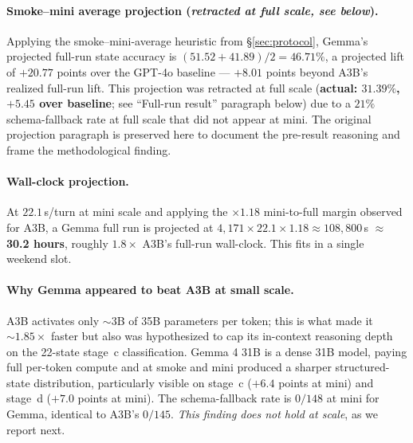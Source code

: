 \documentclass[11pt]{article}
\begin{document}
\paragraph{Smoke--mini average projection (\emph{retracted at full scale, see below}).} Applying the smoke--mini-average heuristic from \S\ref{sec:protocol}, Gemma's projected full-run state accuracy is $(51.52 + 41.89)/2 = 46.71\%$, a projected lift of $\boldsymbol{+20.77}$ points over the GPT-4o baseline --- $+8.01$ points beyond A3B's realized full-run lift. This projection was retracted at full scale (\textbf{actual: $31.39\%$, $+5.45$ over baseline}; see ``Full-run result'' paragraph below) due to a $21\%$ schema-fallback rate at full scale that did not appear at mini. The original projection paragraph is preserved here to document the pre-result reasoning and frame the methodological finding.

\paragraph{Wall-clock projection.} At $22.1$\,s/turn at mini scale and applying the $\times 1.18$ mini-to-full margin observed for A3B, a Gemma full run is projected at $4{,}171 \times 22.1 \times 1.18 \approx 108{,}800$\,s $\approx$ \textbf{30.2 hours}, roughly $1.8\times$ A3B's full-run wall-clock. This fits in a single weekend slot.

\paragraph{Why Gemma appeared to beat A3B at small scale.} A3B activates only $\sim$3B of 35B parameters per token; this is what made it $\sim 1.85\times$ faster but also was hypothesized to cap its in-context reasoning depth on the 22-state stage~c classification. Gemma 4 31B is a dense 31B model, paying full per-token compute and at smoke and mini produced a sharper structured-state distribution, particularly visible on stage~c ($+6.4$ points at mini) and stage~d ($+7.0$ points at mini). The schema-fallback rate is $0/148$ at mini for Gemma, identical to A3B's $0/145$. \emph{This finding does not hold at scale}, as we report next.
\end{document}
